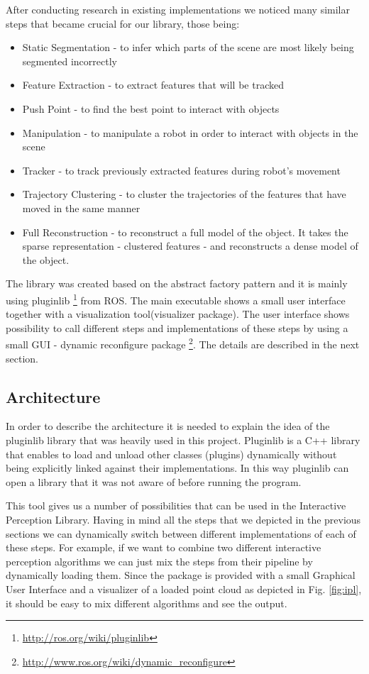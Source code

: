 After conducting research in existing implementations we noticed many similar steps that became crucial for our library, those being:

\begin{itemize}
\item Static Segmentation - to infer which parts of the scene are most likely being segmented incorrectly
\item Feature Extraction - to extract features that will be tracked
\item Push Point - to find the best point to interact with objects
\item Manipulation - to manipulate a robot in order to interact with objects in the scene
\item Tracker - to track previously extracted features during robot's movement
\item Trajectory Clustering - to cluster the trajectories of the features that have moved in the same manner
\item Full Reconstruction - to reconstruct a full model of the object. It takes the sparse representation - clustered features - and reconstructs a dense model of the object.
\end{itemize}




The library was created based on the abstract factory pattern and it is mainly using pluginlib \footnote{\url{http://ros.org/wiki/pluginlib}} from ROS. The main executable  shows a small user interface together with a visualization tool(visualizer package). The user interface shows possibility to call different steps and implementations of these steps by using a small GUI - dynamic reconfigure package \footnote{\url{http://www.ros.org/wiki/dynamic_reconfigure}}. The details are described in the next section.

\subsection{Architecture}

In order to describe the architecture it is needed to explain the idea of the pluginlib library that was heavily used in this project. Pluginlib is a C++ library that enables to load and unload other classes (plugins) dynamically without being explicitly linked against their implementations. In this way pluginlib can open a library that it was not aware of before running the program. 

This tool gives us a number of possibilities that can be used in the Interactive Perception Library. Having in mind all the steps that we depicted in the previous sections we can dynamically switch between different implementations of each of these steps. For example, if we want to combine two different interactive perception algorithms we can just mix the steps from their pipeline by dynamically loading them. Since the package is provided with a small Graphical User Interface and a visualizer of a loaded point cloud as depicted in Fig. \ref{fig:ipl}, it should be easy to mix different algorithms and see the output.


